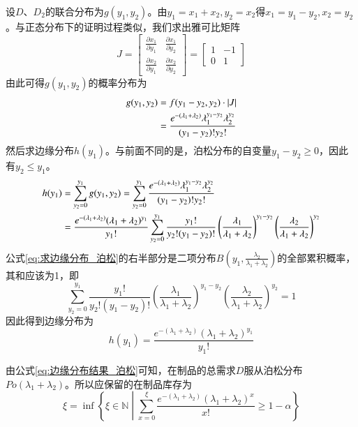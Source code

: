 设$D$、$D_2$的联合分布为$g(y_1,y_2)$。由$y_1=x_1+x_2,y_2=x_2$得$x_1=y_1-y_2,x_2=y_2$。与正态分布下的证明过程类似，我们求出雅可比矩阵
\[
J = \begin{bmatrix}
\frac{\partial x_1}{\partial y_1} & \frac{\partial x_1}{\partial y_2} \\
\frac{\partial x_2}{\partial y_1} & \frac{\partial x_2}{\partial y_2}
\end{bmatrix} = \begin{bmatrix}
1 & -1 \\
0 & 1
\end{bmatrix}
\]
由此可得$g(y_1,y_2)$的概率分布为
\begin{align}
g(y_1,y_2) &= f(y_1-y_2,y_2)\cdot\left|J\right| \notag\\
&= \frac{e^{-(\lambda_1+\lambda_2)}\lambda_1^{y_1-y_2}\lambda_2^{y_2}}{(y_1-y_2)!y_2!}
\label{eq:新联合分布_泊松}
\end{align}
然后求边缘分布$h(y_1)$。与前面不同的是，泊松分布的自变量$y_1-y_2\geq 0$，因此有$y_2\leq y_1$。
\begin{align}
h(y_1) &= \sum_{y_2=0}^{y_1}g(y_1,y_2) = \sum_{y_2=0}^{y_1}\frac{e^{-(\lambda_1+\lambda_2)}\lambda_1^{y_1-y_2}\lambda_2^{y_2}}{(y_1-y_2)!y_2!} \notag\\
&= \frac{e^{-(\lambda_1+\lambda_2)}(\lambda_1+\lambda_2)^{y_1}}{y_1!}\sum_{y_2=0}^{y_1}\frac{y_1!}{y_2!(y_1-y_2)!}\left(\frac{\lambda_1}{\lambda_1+\lambda_2}\right)^{y_1-y_2}\left(\frac{\lambda_2}{\lambda_1+\lambda_2}\right)^{y_2}
\label{eq:求边缘分布_泊松}
\end{align}
公式\ref{eq:求边缘分布_泊松}的右半部分是二项分布$B(y_1,\frac{\lambda_2}{\lambda_1+\lambda_2})$的全部累积概率，其和应该为1，即
\[
\sum_{y_2=0}^{y_1}\frac{y_1!}{y_2!(y_1-y_2)!}\left(\frac{\lambda_1}{\lambda_1+\lambda_2}\right)^{y_1-y_2}\left(\frac{\lambda_2}{\lambda_1+\lambda_2}\right)^{y_2} = 1
\]
因此得到边缘分布为
\begin{equation}
h(y_1) = \frac{e^{-(\lambda_1+\lambda_2)}(\lambda_1+\lambda_2)^{y_1}}{y_1!}
\label{eq:边缘分布结果_泊松}
\end{equation}

由公式\ref{eq:边缘分布结果_泊松}可知，在制品的总需求$D$服从泊松分布$Po(\lambda_1+\lambda_2)$。所以应保留的在制品库存为
\begin{equation}
\xi = \inf\left\{\xi\in\mathbb{N}\middle|\sum_{x=0}^{\xi}\frac{e^{-(\lambda_1+\lambda_2)}(\lambda_1+\lambda_2)^x}{x!}\geq 1-\alpha\right\}
\label{eq:在制品库存_泊松}
\end{equation}


